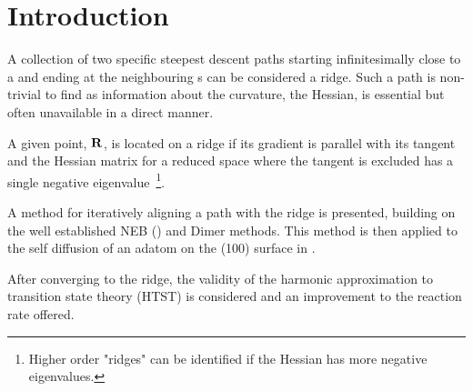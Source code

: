 \section{Introduction}
\label{sec:erm-introduction}

A collection of two specific steepest descent paths starting infinitesimally close to a  and ending at the neighbouring s can be considered a ridge.
Such a path is non-trivial to find as information about the curvature, the Hessian, is essential but often unavailable in a direct manner.

A given point, ${\mathrm{\mathbf{\bm{R}}}}$, is located on a ridge if its gradient is parallel with its tangent and the Hessian matrix for a reduced space where the tangent is excluded has a single negative eigenvalue~\footnote{Higher order "ridges" can be identified if the Hessian has more negative eigenvalues.}.

A method for iteratively aligning a path with the ridge is presented, building on the well established NEB () and Dimer  methods.
This method is then applied to the self diffusion of an adatom on the (100) surface in .

After converging to the ridge, the validity of the harmonic approximation to transition state theory (HTST) is considered and an improvement to the reaction rate offered.


